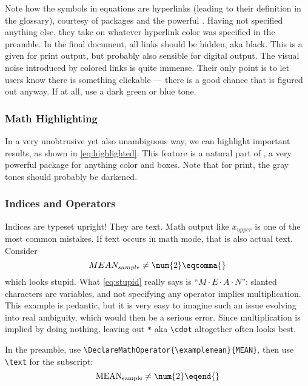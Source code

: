 Note how the symbols in equations are hyperlinks
(leading to their definition in the glossary), courtesy of
packages  and the powerful .
Having not specified anything else, they take on whatever hyperlink color was specified
in the preamble.
In the final document, all links should be hidden, aka black.
This is a given for print output, but probably also sensible for digital output.
The visual noise introduced by colored links is quite immense.
Their only point is to let users know there is something clickable ---
there is a good chance that is figured out anyway.
If at all, use a dark green or blue tone.

\subsubsection{Math Highlighting}

In a very unobtrusive yet also unambiguous way, we can highlight important results,
as shown in \cref{eq:highlighted}.
This feature is a natural part of ,
a very powerful package for anything color and boxes.
Note that for print, the gray tones should probably be darkened.

\subsubsection{Indices and Operators}

Indices are typeset upright!
They are text.
Math output like \(x_{upper}\) is one of the most common mistakes.
If text occurs in math mode, that is also actual text.
Consider
\begin{equation}\label{eq:stupid}
    MEAN_{sample} \neq \num{2}\eqcomma{}
\end{equation}
which looks stupid.
What \cref{eq:stupid} really says is \enquote{\(M \cdot E \cdot A \cdot N\)}:
slanted characters are variables, and not specifying any operator implies
multiplication.
This example is pedantic, but it is very easy to imagine such an issue evolving
into real ambiguity, which would then be a serious error.
Since multiplication is implied by doing nothing, leaving out \verb|*| aka
\verb|\cdot| altogether often looks best.

In the preamble, use \verb|\DeclareMathOperator{\examplemean}{MEAN}|, then use
\verb|\text| for the subscript:
\begin{equation}\label{eq:eqend}
    \examplemean_{\text{sample}} \neq \num{2} \eqend{}
\end{equation}

